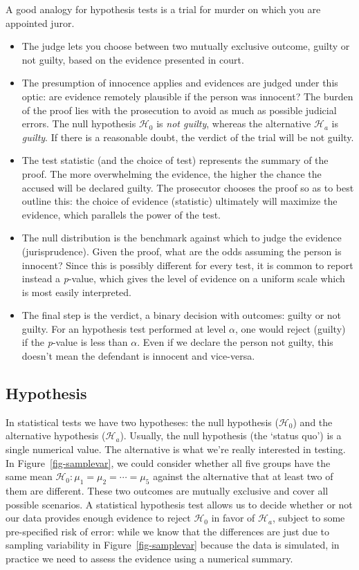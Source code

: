 \documentclass[
  11pt,
  letterpaper,
]{scrbook}
\providecommand{\tightlist}{%
  \setlength{\itemsep}{0pt}\setlength{\parskip}{0pt}}\usepackage{longtable,booktabs,array}
\theoremstyle{definition}
\theoremstyle{definition}
\theoremstyle{remark}
\begin{document}
A good analogy for hypothesis tests is a trial for murder on which you
are appointed juror.

\begin{itemize}
\tightlist
\item
  The judge lets you choose between two mutually exclusive outcome,
  guilty or not guilty, based on the evidence presented in court.
\item
  The presumption of innocence applies and evidences are judged under
  this optic: are evidence remotely plausible if the person was
  innocent? The burden of the proof lies with the prosecution to avoid
  as much as possible judicial errors. The null hypothesis
  \(\mathscr{H}_0\) is \emph{not guilty}, whereas the alternative
  \(\mathscr{H}_a\) is \emph{guilty}. If there is a reasonable doubt,
  the verdict of the trial will be not guilty.
\item
  The test statistic (and the choice of test) represents the summary of
  the proof. The more overwhelming the evidence, the higher the chance
  the accused will be declared guilty. The prosecutor chooses the proof
  so as to best outline this: the choice of evidence (statistic)
  ultimately will maximize the evidence, which parallels the power of
  the test.
\item
  The null distribution is the benchmark against which to judge the
  evidence (jurisprudence). Given the proof, what are the odds assuming
  the person is innocent? Since this is possibly different for every
  test, it is common to report instead a \emph{p}-value, which gives the
  level of evidence on a uniform scale which is most easily interpreted.
\item
  The final step is the verdict, a binary decision with outcomes: guilty
  or not guilty. For an hypothesis test performed at level \(\alpha\),
  one would reject (guilty) if the \emph{p}-value is less than
  \(\alpha\). Even if we declare the person not guilty, this doesn't
  mean the defendant is innocent and vice-versa.
\end{itemize}

\subsection{Hypothesis}\label{hypothesis-1}

In statistical tests we have two hypotheses: the null hypothesis
(\(\mathscr{H}_0\)) and the alternative hypothesis (\(\mathscr{H}_a\)).
Usually, the null hypothesis (the `status quo') is a single numerical
value. The alternative is what we're really interested in testing. In
Figure~\ref{fig-samplevar}, we could consider whether all five groups
have the same mean \(\mathscr{H}_0: \mu_1 = \mu_2 = \cdots = \mu_5\)
against the alternative that at least two of them are different. These
two outcomes are mutually exclusive and cover all possible scenarios. A
statistical hypothesis test allows us to decide whether or not our data
provides enough evidence to reject \(\mathscr{H}_0\) in favor of
\(\mathscr{H}_a\), subject to some pre-specified risk of error: while we
know that the differences are just due to sampling variability in
Figure~\ref{fig-samplevar} because the data is simulated, in practice we
need to assess the evidence using a numerical summary.
\end{document}
